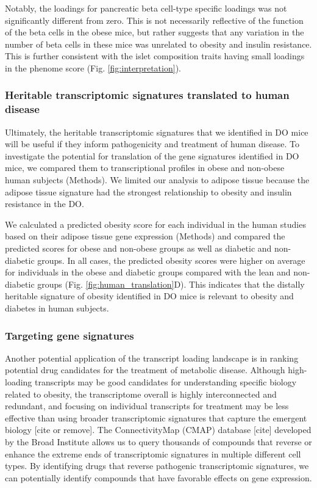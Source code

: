 \documentclass[
]{article}
\begin{document}
Notably, the loadings for pancreatic beta cell-type specific loadings
was not significantly different from zero. This is not necessarily
reflective of the function of the beta cells in the obese mice, but
rather suggests that any variation in the number of beta cells in these
mice was unrelated to obesity and insulin resistance. This is further
consistent with the islet composition traits having small loadings in
the phenome score (Fig. \ref{fig:interpretation}).

\subsubsection{Heritable transcriptomic signatures translated to human
disease}\label{heritable-transcriptomic-signatures-translated-to-human-disease}

Ultimately, the heritable transcriptomic signatures that we identified
in DO mice will be useful if they inform pathogenicity and treatment of
human disease. To investigate the potential for translation of the gene
signatures identified in DO mice, we compared them to transcriptional
profiles in obese and non-obese human subjects (Methods). We limited our
analysis to adipose tissue because the adipose tissue signature had the
strongest relationship to obesity and insulin resistance in the DO.

We calculated a predicted obesity score for each individual in the human
studies based on their adipose tissue gene expression (Methods) and
compared the predicted scores for obese and non-obese groups as well as
diabetic and non-diabetic groups. In all cases, the predicted obesity
scores were higher on average for individuals in the obese and diabetic
groups compared with the lean and non-diabetic groups (Fig.
\ref{fig:human_translation}D). This indicates that the distally
heritable signature of obesity identified in DO mice is relevant to
obesity and diabetes in human subjects.

\subsubsection{Targeting gene
signatures}\label{targeting-gene-signatures}

Another potential application of the transcript loading landscape is in
ranking potential drug candidates for the treatment of metabolic
disease. Although high-loading transcripts may be good candidates for
understanding specific biology related to obesity, the transcriptome
overall is highly interconnected and redundant, and focusing on
individual transcripts for treatment may be less effective than using
broader transcriptomic signatures that capture the emergent biology
{[}cite or remove{]}. The ConnectivityMap (CMAP) database {[}cite{]}
developed by the Broad Institute allows us to query thousands of
compounds that reverse or enhance the extreme ends of transcriptomic
signatures in multiple different cell types. By identifying drugs that
reverse pathogenic transcriptomic signatures, we can potentially
identify compounds that have favorable effects on gene expression.
\end{document}
